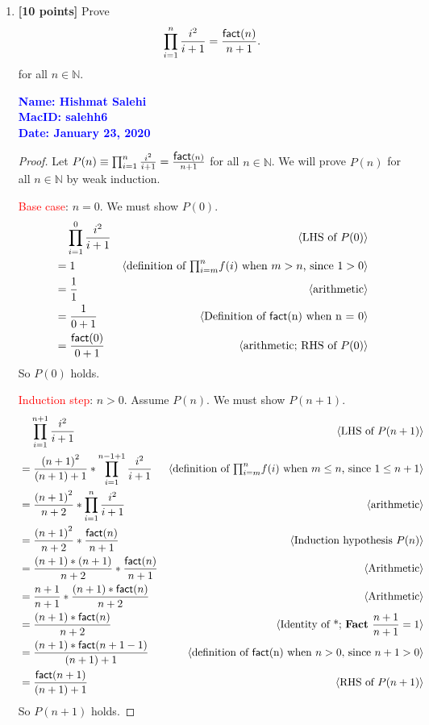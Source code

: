 \documentclass[11pt,fleqn]{article}
\newcommand{\mname}[1]{\mbox{\sf #1}}
\newcommand{\pnote}[1]{{\langle \text{#1} \rangle}}
\begin{document}
\begin{enumerate}

  \item \textbf{[10 points]} Prove \[\prod_{i = 1}^{n} \frac{i^2}{i +
    1} = \frac{\mname{fact}(n)}{n + 1}.\] for all $n \in \mathbb{N}$.

  \bigskip

  \textcolor{blue}{\textbf{Name: Hishmat Salehi \\ MacID: salehh6 \\ Date: January 23, 2020}}

\begin{proof}
Let $P(n) \equiv \prod_{i = 1}^{n} \frac{i^2}{i +
    1} = \frac{\mname{fact}(n)}{n + 1}$ for all $n \in \mathbb{N}$.  We will prove $P(n)$
for all $n \in \mathbb{N}$ by weak induction.

\medskip

\textcolor{red}{Base case}: $n = 0$.  We must show $P(0)$.
\begin{align*}
  &\phantom{{}=} \prod_{i = 1}^{0} \frac{i^2}{i + 1} & \pnote{LHS of $P(0)$}\\
  &= 1          & \pnote{definition of $\textstyle{\prod}_{i=m}^{n} f(i)$ when $m > n$, since $1 > 0$}\\
  &= \frac{1}{1}  & \pnote{arithmetic}\\
  &= \frac{1}{0 + 1}      & \pnote{Definition of \mname{fact}(n) when n = 0}\\
  &= \frac{\mname{fact}(0)}{0 + 1}    & \pnote{arithmetic; RHS of $P(0)$}
\end{align*}
So $P(0)$ holds.

\medskip

\textcolor{red}{Induction step}: $n > 0$. Assume $P(n)$. We must show $P(n + 1)$.
\begin{align*}
  &\phantom{{}=} \prod_{i = 1}^{n+1} \frac{i^2}{i + 1}   & \pnote{LHS of $P(n + 1)$}\\
  &= \frac{{(n+1)}^2}{(n+1)+1}* \prod_{i = 1}^{n-1+1} \frac{i^2}{i + 1}  & \pnote{definition of $\textstyle{\prod}_{i=m}^{n} f(i)$ when $m \le n$, since $1 \le n+1$}\\
  &= \frac{{(n+1)}^2}{n+2}* \prod_{i = 1}^{n} \frac{i^2}{i + 1}  & \pnote{arithmetic}\\
  &= \frac{{(n+1)}^2}{n+2}* \frac{\mname{fact}(n)}{n + 1}  & \pnote{Induction hypothesis $P(n)$}\\
  &= \frac{(n+1)*(n+1)}{n+2}* \frac{\mname{fact}(n)}{n + 1}  & \pnote{Arithmetic}\\
  &= \frac{n+1}{n+1}* \frac{(n+1)*\mname{fact}(n)}{n + 2}  & \pnote{Arithmetic}\\
  &= \frac{(n+1)*\mname{fact}(n)}{n + 2}  & \pnote{Identity of *; \textbf{Fact} $\frac{n+1}{n+1} = 1$}\\
  &= \frac{(n+1)*\mname{fact}(n+1-1)}{(n+1)+1}  & \pnote{definition of \mname{fact}(n) when $n > 0$, since $n + 1 > 0$}\\
  &= \frac{\mname{fact}(n+1)}{(n+1)+1}  & \pnote{RHS of $P(n + 1)$}\\
\end{align*}
So $P(n + 1)$ holds.


\end{proof}
\end{enumerate}
\end{document}
